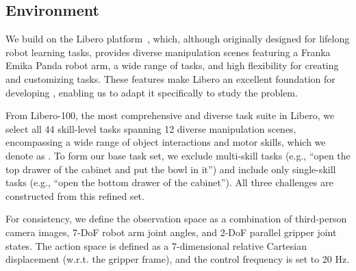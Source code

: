 \subsection{Environment}
\label{subsec:bm_env}

We build \bm on the Libero platform~\cite{liu2024libero}, which, although originally designed for lifelong robot learning tasks, provides diverse manipulation scenes featuring a Franka Emika Panda robot arm, a wide range of tasks, and high flexibility for creating and customizing tasks. These features make Libero an excellent foundation for developing \bm, enabling us to adapt it specifically to study the \pb problem.

From Libero-100, the most comprehensive and diverse task suite in Libero, we select all 44 skill-level tasks spanning 12 diverse manipulation scenes, encompassing a wide range of object interactions and motor skills, which we denote as \taskoriginal. To form our base task set, we exclude multi-skill tasks (e.g., ``open the top drawer of the cabinet and put the bowl in it'') and include only single-skill tasks (e.g., ``open the bottom drawer of the cabinet''). All three challenges are constructed from this refined set.

For consistency, we define the observation space as a combination of third-person camera images, 7-DoF robot arm joint angles, and 2-DoF parallel gripper joint states. The action space is defined as a 7-dimensional relative Cartesian displacement (w.r.t. the gripper frame), and the control frequency is set to 20 Hz.



